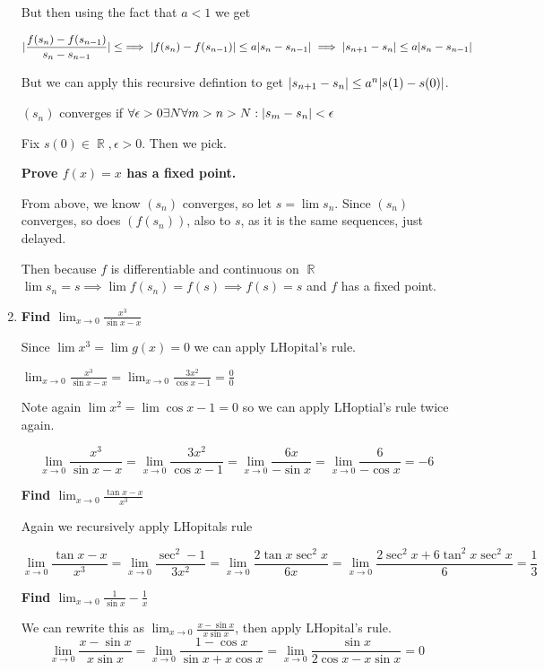 \documentclass[10pt,a4paper]{article}
\DeclareMathOperator*{\R}{\mathbb{R}}
\DeclarePairedDelimiter{\abs}{\lvert}{\rvert}
\begin{document}
\begin{enumerate}
        But then using the fact that $a < 1 $ we get 

        $$\abs{\frac{f(s_n) - f(s_{n-1})}{s_n - s_{n-1}}} \leq  \implies \abs{f(s_n) - f(s_{n-1})} \leq a \abs{s_n - s_{n-1}} \implies \abs{s_{n+1} -s_n} \leq a \abs{s_n - s_{n-1}}$$

        But we can apply this recursive defintion to get $\abs{s_{n+1} -s_n} \leq a^n \abs{s(1)-s(0)}$.

        $(s_n)$ converges if $\forall \epsilon > 0 \exists N \forall m > n > N: \abs{s_m - s_n} < \epsilon$

        Fix $s(0) \in \R, \epsilon>0$. Then we pick.

    \textbf{ Prove $f(x)= x$ has a fixed point.}

    From above, we know $(s_n)$ converges, so let $s = \lim s_n$. Since $(s_n)$ converges, so does $(f(s_n))$, also to $s$, as it is the same sequences, just delayed.

    Then because $f$ is differentiable and continuous on $\R$ $\lim s_n = s \implies \lim f(s_n)= f(s) \implies f(s) = s$ and $f$ has a fixed point.

    \item \textbf{Find $\lim_{x \to 0} \frac{x^3}{\sin x - x}$}

        Since $\lim x^3 = \lim g(x) = 0$ we can apply LHopital's rule.

        $\lim_{x \to 0} \frac{x^3}{\sin x - x} = \lim_{x \to 0} \frac{3x^2}{\cos x - 1} = \frac{0}{0}$

        Note again $\lim x^2 = \lim \cos x -1 = 0$ so we can apply LHoptial's rule twice again.

        $$\lim_{x \to 0} \frac{x^3}{\sin x - x} = \lim_{x \to 0} \frac{3x^2}{\cos x - 1} = \lim_{x \to 0} \frac{6x}{-\sin x} = \lim_{x \to 0} \frac{6}{-\cos x} = -6$$

    \textbf{Find $\lim_{x \to 0} \frac{\tan x - x}{x^3}$}

        Again we recursively apply LHopitals rule

        $$\lim_{x \to 0} \frac{\tan x -x}{ x^3} = \lim_{x \to 0}\frac{\sec^2 -1}{3x^2} = \lim_{x \to 0} \frac{2 \tan x \sec^2 x }{6x} = \lim_{x \to 0} \frac{2 \sec^2 x + 6 \tan^2 x \sec^2 x}{6} = \frac{1}{3}$$

    \textbf{Find $\lim_{x \to 0} \frac{1}{\sin x } - \frac{1}{x}$}

        We can rewrite this as $\lim_{x \to 0} \frac{x - \sin x}{ x \sin x }$, then apply LHopital's rule.
        $$\lim_{x \to 0} \frac{x - \sin x}{ x \sin x } = \lim_{x \to 0} \frac{1 - \cos x}{\sin x +  x \cos x } = \lim_{x \to 0} \frac{\sin x}{2 \cos x - x \sin x } = 0$$ 


\end{enumerate}
\end{document}
